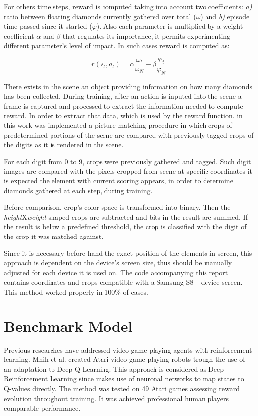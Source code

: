 \documentclass[peerreview,onecolumn]{IEEEtran}
\begin{document}
	For others time steps, reward is computed taking into account two coefficients: \textit{a)} ratio between floating diamonds currently gathered over total ($\omega$) and \textit{b)} episode time passed since it started ($\varphi$). Also each parameter is multiplied by a weight coefficient $\alpha$ and $\beta$ that regulates its importance, it permits experimenting different parameter's level of impact. In such cases reward is computed as:
	
	\begin{equation}
	  r(s_t, a_t) = \alpha \frac{\omega_t}{\omega_N} - \beta \frac{\varphi_t}{\varphi_N} 
	\end{equation}
	
	
	There exists in the scene an object providing information on how many diamonds has been collected. During training, after an action is inputed into the scene a frame is captured and processed to extract the information needed to compute reward. In order to extract that data, which is used by the reward function, in this work was implemented a picture matching procedure in which crops of predetermined portions of the scene are compared with previously tagged crops of the digits as it is rendered in the scene. 

	For each digit from 0 to 9, crops were previously gathered and tagged. Such digit images are compared with the pixels cropped from scene at specific coordinates it is expected the element with current scoring appears, in order to determine diamonds gathered at each step, during training. 
	
	Before comparison, crop's color space is transformed into binary. Then the \textit{height}X\textit{weight} shaped crops are subtracted and bits in the result are summed. If the result is below a predefined threshold, the crop is classified with the digit of the crop it was matched against.
	  
	Since it is necessary before hand the exact position of the elements in screen, this approach is dependent on the device's screen size, thus should be manually adjusted for each device it is used on. The code accompanying this report contains coordinates and crops compatible with a Samsung S8+ device screen. This method worked properly in 100\% of cases.
	
	  \section{Benchmark Model}
	  
	  Previous researches have addressed video game playing agents with reinforcement learning. Mnih et al.  \cite{replay_buffer_2015} created Atari video game playing robots trough the use of an adaptation to Deep Q-Learning. This approach is considered as Deep Reinforcement Learning since makes use of neuronal networks to map states to Q-values directly. The method was tested on 49 Atari games assessing reward evolution throughout training. It was achieved professional human players comparable performance. 
	  
\end{document}
